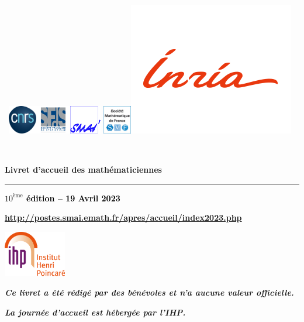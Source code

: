 \documentclass[11pt]{book}
\renewcommand*{\mp}{\textperiodcentered}
\newcommand{\verifier}[1]{\textcolor{black}{#1}}
\begin{document}
\renewcommand{\labelitemi}{$\bullet$}
\setlength{\parindent}{0cm}

{\pagestyle{empty}
%
~\hfill\includegraphics[height=1.25cm]{Images/CNRS}\hfill\includegraphics[height=1.25cm]{Images/sfds}\hfill\includegraphics[height=1.25cm]{Images/SMAI}
\hfill\includegraphics[height=1.25cm]{Images/smf}\hfill\includegraphics[height=1.cm]{Images/inria_fr}\hfill~

~

\vfill

\textbf{\Huge Livret d'accueil des math\'ematicien\mp ne\mp s}

\hrule

\begin{flushright}
\textbf{\Large \verifier{$10^\text{\`eme}$ \'edition -- 19 Avril 2023}}
\end{flushright}

\vskip 2cm

\begin{center}

\textbf{\large \url{http://postes.smai.emath.fr/apres/accueil/index2023.php}}

\vfill

\includegraphics[height=2cm]{Images/IHP} 

\bigskip

\textit{\textbf{Ce livret a \'et\'e r\'edig\'e par des b\'en\'evoles
et n'a aucune valeur officielle.}}

\textit{\textbf{La journ\'ee d'accueil est h\'eberg\'ee par l'IHP.}}

\end{center}

\newpage

~

\newpage

\tableofcontents

\newpage
}
\end{document}

